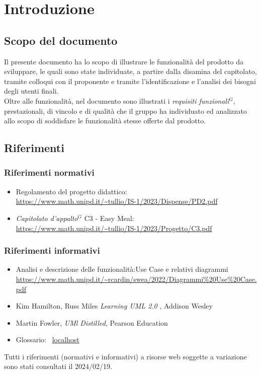 
\section{Introduzione}

\subsection{Scopo del documento}

Il presente documento ha lo scopo di illustrare le funzionalità del prodotto da sviluppare,
le quali sono state individuate, a partire dalla disamina del capitolato, tramite colloqui con 
il proponente e tramite l'identificazione e l'analisi dei bisogni degli utenti finali.\\
Oltre alle funzionalità, nel documento sono illustrati i \emph{requisiti funzionali}$^{G}$, prestazionali, di 
vincolo e di qualità che il gruppo ha individuato ed analizzato allo scopo di soddisfare le 
funzionalità stesse offerte dal prodotto. 

\subsection{Riferimenti}
\subsubsection{Riferimenti normativi}

\begin{itemize}
    \item Regolamento del progetto didattico: \\
    \url{https://www.math.unipd.it/~tullio/IS-1/2023/Dispense/PD2.pdf}
  \item \emph{Capitolato d’appalto}$^{G}$ C3 - Easy Meal: \\
    \url{https://www.math.unipd.it/~tullio/IS-1/2023/Progetto/C3.pdf}
\end{itemize}

\subsubsection{Riferimenti informativi} 

\begin{itemize}
    \item Analisi e descrizione delle funzionalità:Use Case e relativi diagrammi \\
    \url{https://www.math.unipd.it/~rcardin/swea/2022/Diagrammi%20Use%20Case.pdf}
    \item Kim Hamilton, Russ Miles \emph{Learning UML 2.0 }, Addison Wesley \\
    \item Martin Fowler, \emph{UMl Distilled}, Pearson Education
    \item Glossario: \
    \url{localhost} %

\end{itemize}

Tutti i riferimenti (normativi e informativi) a risorse web soggette a variazione sono stati consultati il 2024/02/19.
